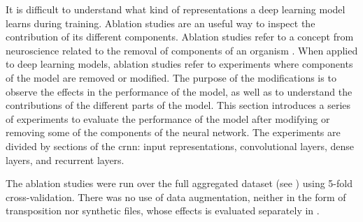 
It is difficult to understand what kind of representations a
deep learning model learns during training. Ablation studies
are an useful way to inspect the contribution of its
different components. Ablation studies refer to a concept
from neuroscience related to the removal of components of an
organism \parencite{meyes2019ablation}. When applied to deep
learning models, ablation studies refer to experiments where
components of the model are removed or modified. The purpose
of the modifications is to observe the effects in the
performance of the model, as well as to understand the
contributions of the different parts of the model. This
section introduces a series of experiments to evaluate the
performance of the model after modifying or removing some of
the components of the neural network. The experiments are
divided by sections of the \gls{crnn}: input
representations, convolutional layers, dense layers, and
recurrent layers.

The ablation studies were run over the full aggregated
dataset (see ) using 5-fold
cross-validation. There was no use of data augmentation,
neither in the form of transposition nor synthetic files,
whose effects is evaluated separately in
.
